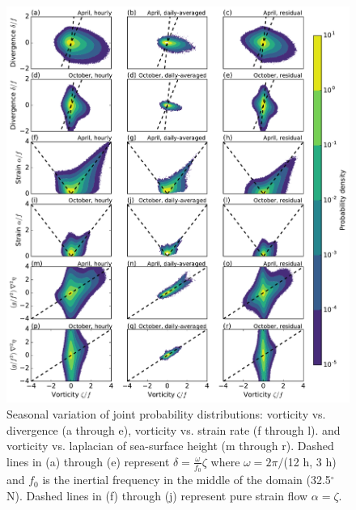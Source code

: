 \documentclass[grl]{agutex2015}
\begin{document}
\begin{article}




\begin{figure}[ht]
  \begin{center}
    \includegraphics[width=.6\textwidth]{figs/fig3.pdf}
 \caption{Seasonal variation of joint probability distributions: vorticity vs.
          divergence (a through e), vorticity vs. strain rate (f through l).
          and vorticity vs. laplacian of sea-surface height (m through r).
          Dashed lines in (a) through (e) represent $\delta = \frac{\omega}{f_0}
          \zeta$ where $\omega = 2\pi/$(12 h, 3 h) and $f_0$ is the inertial frequency
          in the middle of the domain (32.5$^\circ$ N). Dashed lines in (f) through (j)
          represent pure strain flow $\alpha = \zeta$.}
 \label{fig3}
 \end{center}
\end{figure}



\end{article}
\end{document}
